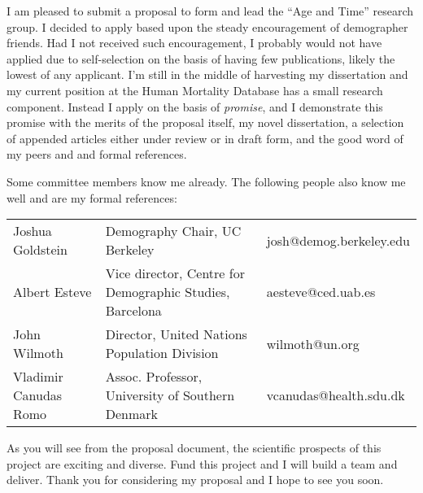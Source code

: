 \documentclass[10pt,dateno,sigleft]{newlfm}
\begin{document}
\begin{newlfm}

I am pleased to submit a proposal to form and lead the ``Age and Time'' research
group. I decided to apply based upon the steady encouragement of demographer
friends.
Had I not received such encouragement, I probably would not have applied due to self-selection on the basis of having few publications,
likely the lowest of any applicant. I'm still in the middle of harvesting my
dissertation and my current position at the Human Mortality Database has a small
research component.
Instead I apply on the basis of \textit{promise}, and I demonstrate this promise with
the merits of the proposal itself, my novel dissertation, a selection of
appended articles either under review or in draft form, and the good word of my
peers and and formal references.

Some committee members know me already. The following people also know me well
and are my formal references:

\begin{center}
\begin{tabular}{l l l}
Joshua Goldstein & \small{Demography Chair, UC Berkeley} &
josh@demog.berkeley.edu
\\
Albert Esteve & \small{Vice director, Centre for Demographic Studies}, Barcelona
& aesteve@ced.uab.es\\
John Wilmoth & \small{Director, United Nations Population Division} &
wilmoth@un.org\\
Vladimir Canudas Romo & \small{Assoc. Professor, University of Southern Denmark}
& vcanudas@health.sdu.dk
\end{tabular}
\end{center}

As you will see from the proposal document, the scientific prospects of this
project are exciting and diverse. Fund this project and I will build a team and
deliver. Thank you for considering my proposal and I hope to see you soon.

\end{newlfm}
\end{document}
